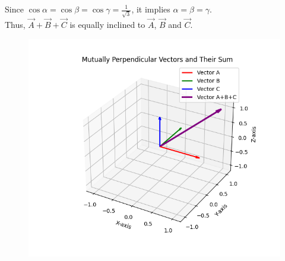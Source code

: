 \documentclass[journal]{IEEEtran}
\begin{document}
Since $\cos \alpha = \cos \beta = \cos \gamma = \frac{1}{\sqrt{3}}$, it implies $\alpha = \beta = \gamma$.\\

Thus, $\vec{A} + \vec{B} + \vec{C}$ is equally inclined to $\vec{A}$, $\vec{B}$ and $\vec{C}$.


\begin{figure}[H]
\centering
\includegraphics[width=0.8\columnwidth]{figs/fig1.png}
\caption{}
\label{fig:1}
\end{figure}
\end{document}

